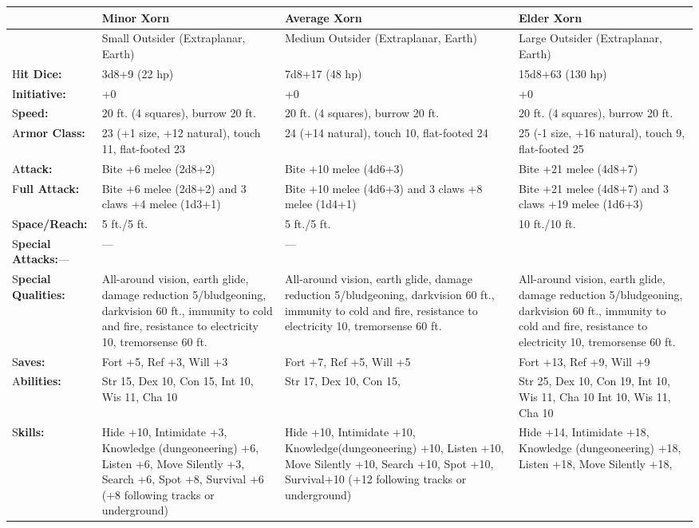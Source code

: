 \documentclass{article}
\begin{document}
\begin{tabular}{|>{\raggedright}p{42pt}|>{\raggedright}p{86pt}|>{\raggedright}p{86pt}|>{\raggedright}p{86pt}|}
\hline
  & M\textbf{inor Xorn} & A\textbf{verage Xorn} & E\textbf{lder Xorn}\tabularnewline
\hline
  & Small Outsider (Extraplanar, Earth) & Medium Outsider (Extraplanar, Earth) & Large 
Outsider (Extraplanar, Earth)\tabularnewline
\hline
H\textbf{it Dice:} & 3d8+9 (22 hp) & 7d8+17 (48 hp) & 15d8+63 (130 hp)\tabularnewline
\hline
I\textbf{nitiative:} & +0 & +0 & +0\tabularnewline
\hline
S\textbf{peed:} & 20 ft. (4 squares), burrow 20 ft. & 20 ft. (4 squares), burrow 
20 ft. & 20 ft. (4 squares), burrow 20 ft.\tabularnewline
\hline
A\textbf{rmor Class:} & 23 (+1 size, +12 natural), touch 11, flat-footed 23 & 24 
(+14 natural), touch 10, flat-footed 24 & 25 (-1 size, +16 natural), touch 9, flat-footed 
25\tabularnewline
\hline
A\textbf{ttack:} & Bite +6 melee (2d8+2) & Bite +10 melee (4d6+3) & Bite +21 melee 
(4d8+7)\tabularnewline
\hline
F\textbf{ull Attack:} & Bite +6 melee (2d8+2) and 3 claws +4 melee (1d3+1) & Bite 
+10 melee (4d6+3) and 3 claws +8 melee (1d4+1) & Bite +21 melee (4d8+7) and 3 claws 
+19 melee (1d6+3)\tabularnewline
\hline
S\textbf{pace/Reach:} & 5 ft./5 ft. & 5 ft./5 ft. & 10 ft./10 ft.\tabularnewline
\hline
S\textbf{pecial Attacks:}--- & --- & --- & \tabularnewline
\hline
S\textbf{pecial Qualities:} & All-around vision, earth glide, damage reduction 
5/bludgeoning, darkvision 60 ft., immunity to cold and fire, resistance to electricity 
10, tremorsense 60 ft. & All-around vision, earth glide, damage reduction 5/bludgeoning, 
darkvision 60 ft., immunity to cold and fire, resistance to electricity 10, tremorsense 
60 ft. & All-around vision, earth glide, damage reduction 5/bludgeoning, darkvision 
60 ft., immunity to cold and fire, resistance to electricity 10, tremorsense 60 
ft.\tabularnewline
\hline
S\textbf{aves:} & Fort +5, Ref +3, Will +3 & Fort +7, Ref +5, Will +5 & Fort +13, 
Ref +9, Will +9\tabularnewline
\hline
A\textbf{bilities:} & Str 15, Dex 10, Con 15, Int 10, Wis 11, Cha 10 & Str 17, 
Dex 10, Con 15, & Str 25, Dex 10, Con 19, Int 10, Wis 11, Cha 10 Int 10, Wis 11, 
Cha 10\tabularnewline
\hline
S\textbf{kills:} & Hide +10, Intimidate +3, Knowledge (dungeoneering) +6, Listen 
+6, Move Silently +3, Search +6, Spot +8, Survival +6 (+8 following tracks or underground) & Hide 
+10, Intimidate +10, Knowledge(dungeoneering) +10, Listen +10, Move Silently +10, 
Search +10, Spot +10, Survival+10 (+12 following tracks or underground) & Hide 
+14, Intimidate +18, Knowledge (dungeoneering) +18, Listen +18, Move Silently +18, 

\end{tabular}
\end{document}
